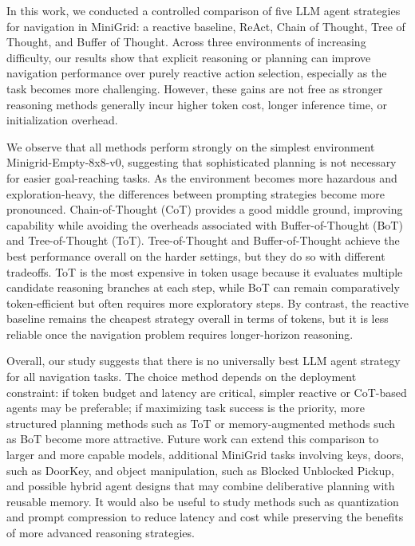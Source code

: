In this work, we conducted a controlled comparison of five LLM agent strategies for navigation in MiniGrid: a reactive baseline, ReAct, Chain of Thought, Tree of Thought, and Buffer of Thought. Across three environments of increasing difficulty, our results show that explicit reasoning or planning can improve navigation performance over purely reactive action selection, especially as the task becomes more challenging. However, these gains are not free as stronger reasoning methods generally incur higher token cost, longer inference time, or initialization overhead. 

We observe that all methods perform strongly on the simplest environment Minigrid-Empty-8x8-v0, suggesting that sophisticated planning is not necessary for easier goal-reaching tasks. As the environment becomes more hazardous and exploration-heavy, the differences between prompting strategies become more pronounced. Chain-of-Thought (CoT) \cite{wei2023chainofthoughtpromptingelicitsreasoning} provides a good middle ground, improving capability while avoiding the overheads associated with Buffer-of-Thought (BoT) and Tree-of-Thought (ToT). Tree-of-Thought \cite{yao2023tree} and Buffer-of-Thought \cite{yang2024buffer} achieve the best performance overall on the harder settings, but they do so with different tradeoffs. ToT is the most expensive in token usage because it evaluates multiple candidate reasoning branches at each step, while BoT can remain comparatively token-efficient but often requires more exploratory steps. By contrast, the reactive baseline remains the cheapest strategy overall in terms of tokens, but it is less reliable once the navigation problem requires longer-horizon reasoning.

Overall, our study suggests that there is no universally best LLM agent strategy for all navigation tasks. The choice method depends on the deployment constraint: if token budget and latency are critical, simpler reactive or CoT-based agents may be preferable; if maximizing task success is the priority, more structured planning methods such as ToT or memory-augmented methods such as BoT become more attractive. Future work can extend this comparison to larger and more capable models, additional MiniGrid \cite{chevalier2023minigrid} tasks involving keys, doors, such as DoorKey, and object manipulation, such as Blocked Unblocked Pickup, and possible hybrid agent designs that may combine deliberative planning with reusable memory. It would also be useful to study methods such as quantization and prompt compression to reduce latency and cost while preserving the benefits of more advanced reasoning strategies.
